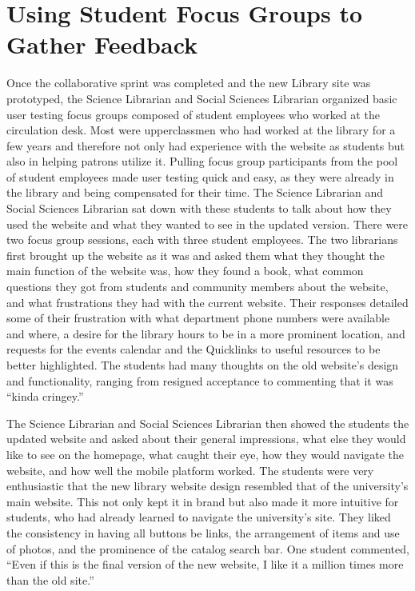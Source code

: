 \documentclass{book}
\begin{document}
\hypertarget{using-student-focus-groups-to-gather-feedback}{%
\section{Using Student Focus Groups to Gather
Feedback}\label{using-student-focus-groups-to-gather-feedback}}

Once the collaborative sprint was completed and the new Library site was
prototyped, the Science Librarian and Social Sciences Librarian organized
basic user testing focus groups composed of student employees who worked at
the circulation desk. Most were upperclassmen who had worked at the library
for a few years and therefore not only had experience with the website as
students but also in helping patrons utilize it. Pulling focus group
participants from the pool of student employees made user testing quick and
easy, as they were already in the library and being compensated for their
time. The Science Librarian and Social Sciences Librarian sat down with these
students to talk about how they used the website and what they wanted to see
in the updated version. There were two focus group sessions, each with three
student employees. The two librarians first brought up the website as it was
and asked them what they thought the main function of the website was, how
they found a book, what common questions they got from students and community
members about the website, and what frustrations they had with the current
website. Their responses detailed some of their frustration with what
department phone numbers were available and where, a desire for the library
hours to be in a more prominent location, and requests for the events calendar
and the Quicklinks to useful resources to be better highlighted. The students
had many thoughts on the old website's design and functionality, ranging from
resigned acceptance to commenting that it was ``kinda cringey.''

The Science Librarian and Social Sciences Librarian then showed the students
the updated website and asked about their general impressions, what else they
would like to see on the homepage, what caught their eye, how they would
navigate the website, and how well the mobile platform worked. The students
were very enthusiastic that the new library website design resembled that of
the university's main website. This not only kept it in brand but also made it
more intuitive for students, who had already learned to navigate the
university's site. They liked the consistency in having all buttons be links,
the arrangement of items and use of photos, and the prominence of the catalog
search bar. One student commented, ``Even if this is the final version of the
new website, I like it a million times more than the old site.''
\end{document}
